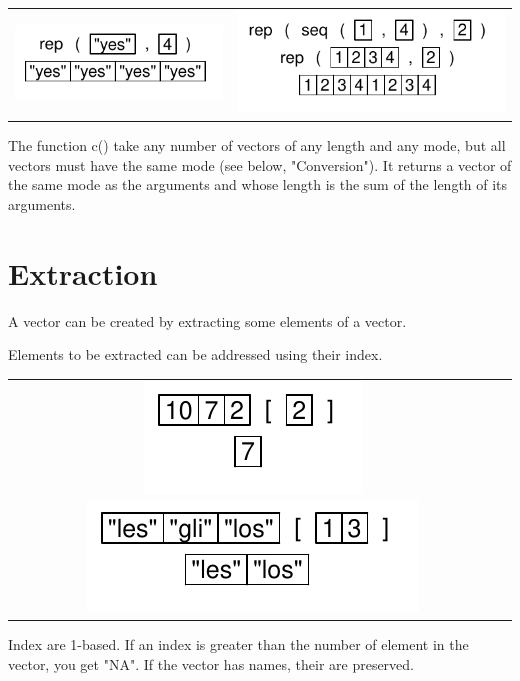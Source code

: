 \documentclass[pdflatex]{article}
\begin{document}
\begin{tabular}{cc}
\includegraphics{rep} & \includegraphics{rep_seq}\\
\end{tabular}

The function c() take any number of vectors of any length and any mode, but all vectors must have the same mode (see below, "Conversion"). It returns a vector of the same mode as the arguments and whose length is the sum of the length of its arguments.

\section{Extraction}

A vector can be created by extracting some elements of a vector.

Elements to be extracted can be addressed using their index.

\begin{tabular}{cc}
\includegraphics{extract_num} 
\includegraphics{extract_nums} 
\end{tabular}

Index are 1-based. If an index is greater than the number of element in the vector, you get "NA". If the vector has names, their are preserved.
\end{document}
